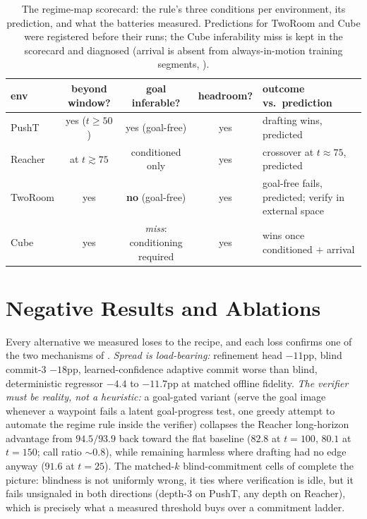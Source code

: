 \documentclass{article}
\begin{document}
\begin{table}[h]
\centering
\small
\setlength{\tabcolsep}{5pt}
\caption{The regime-map scorecard: the rule's three conditions per environment,
its prediction, and what the batteries measured. Predictions for TwoRoom and Cube
were registered before their runs; the Cube inferability miss is kept in the
scorecard and diagnosed (arrival is absent from always-in-motion training
segments, ).}
\label{tab:scorecard}
\begin{tabular}{lcccl}
\toprule
env & beyond window? & goal inferable? & headroom? & outcome vs.\ prediction \\
\midrule
PushT   & yes ($t{\ge}50$) & yes (goal-free) & yes & drafting wins, predicted \\
Reacher & at $t{\gtrsim}75$ & conditioned only & yes & crossover at $t{\approx}75$, predicted \\
TwoRoom & yes & \textbf{no} (goal-free) & yes & goal-free fails, predicted; verify in external space \\
Cube    & yes & \emph{miss}: conditioning required & yes & wins once conditioned $+$ arrival \\
\bottomrule
\end{tabular}
\end{table}



\section{Negative Results and Ablations}
\label{sec:negatives}
Every alternative we measured loses to the recipe, and each loss confirms one of the
two mechanisms of . \emph{Spread is load-bearing:} refinement head
$-11$pp, blind commit-3 $-18$pp, learned-confidence adaptive commit worse than blind,
deterministic regressor $-4.4$ to $-11.7$pp at matched offline fidelity. \emph{The
verifier must be reality, not a heuristic:} a goal-gated variant (serve the goal
image whenever a waypoint fails a latent goal-progress test, one greedy attempt to
automate the regime rule inside the verifier) collapses the Reacher long-horizon
advantage from $94.5/93.9$ back toward the flat baseline ($82.8$ at $t{=}100$, $80.1$
at $t{=}150$; call ratio ${\sim}0.8$), while remaining harmless where drafting had no
edge anyway ($91.6$ at $t{=}25$). The matched-$k$ blind-commitment cells of
 complete the picture: blindness is not uniformly wrong, it ties where verification is idle, but it fails unsignaled in both directions
(depth-3 on PushT, any depth on Reacher), which is precisely what a measured
threshold buys over a commitment ladder.
\end{document}
